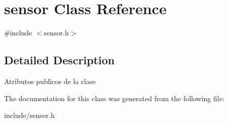 \hypertarget{classsensor}{}\section{sensor Class Reference}
\label{classsensor}


{\ttfamily \#include $<$sensor.\+h$>$}



\subsection{Detailed Description}
Atributos publicos de la clase 

The documentation for this class was generated from the following file\+:\begin{DoxyCompactItemize}
\item 
include/sensor.\+h\end{DoxyCompactItemize}
